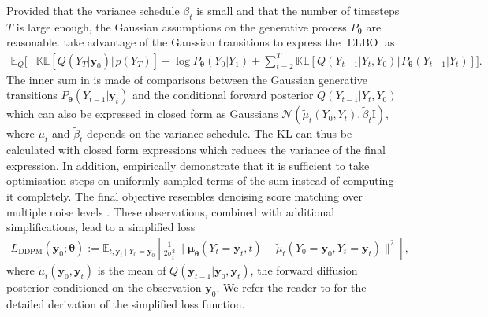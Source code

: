 Provided that the variance schedule $\beta_t$ is small and that the number of timesteps $T$ is large enough, the Gaussian assumptions on the generative process $P_{\bm{\theta}}$ are reasonable. \citet{ho_denoising_2020} take advantage of the Gaussian transitions to express the $\operatorname{ELBO}$ as
\begin{align}
        \mathbb{E}_Q \biggl[& \mathbb{KL}\left[Q(Y_T|\mathbf{y}_0)\Vert p(Y_T)\right] - \log P_{\bm{\theta}}(Y_0|Y_1) + \sum_{t=2}^T \mathbb{KL}\left[Q(Y_{t-1}|Y_t, Y_0)\Vert P_{\bm{\theta}}(Y_{t-1}|Y_t)\right]
     \biggr]. \label{eq:simple_DDPM_ELBO}
\end{align}
The inner sum in  is made of comparisons between the Gaussian generative transitions $P_{\bm{\theta}}(Y_{t-1}|\mathbf{y}_t)$ and the conditional forward posterior $Q(Y_{t-1}|Y_t, Y_0)$ which can also be expressed in closed form as Gaussians $\mathcal{N}(\tilde{\mu}_t(Y_0, Y_t), \tilde{\beta}_t \text{I})$, where $\tilde{\mu}_t$ and $\tilde{\beta}_t$ depends on the variance schedule. The KL can thus be calculated with closed form expressions which reduces the variance of the final expression.
In addition, \citet{ho_denoising_2020} empirically demonstrate that it is sufficient to take optimisation steps on uniformly sampled terms of the sum instead of computing it completely. The final objective resembles denoising score matching over multiple noise levels \citep{vincent2011connection}. These observations, combined with additional simplifications, lead to a simplified loss
\begin{align}
    L_\text{DDPM}(\mathbf{y}_0; \bm{\theta}) := \mathbb{E}_{t, \mathbf{y}_t \mid Y_0 = \mathbf{y}_0}\left[ \frac{1}{2\sigma^2_t}\lVert \mathbf{\mu}_{\bm{\theta}}(Y_t=\mathbf{y}_t, t) - \tilde{\mu}_t(Y_0=\mathbf{y}_0, Y_t=\mathbf{y}_t)  \rVert^2\right],
\end{align}
where $\tilde{\mu}_t(\mathbf{y}_0, \mathbf{y}_t)$ is the mean of $Q(\mathbf{y}_{t-1}|\mathbf{y}_{0}, \mathbf{y}_{t})$, the forward diffusion posterior conditioned on the observation $\mathbf{y}_{0}$. We refer the reader to \citet{ho_denoising_2020} for the detailed derivation of the simplified loss function.

